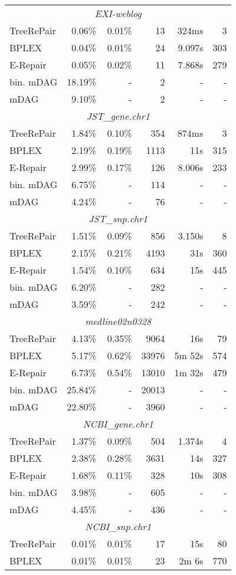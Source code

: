 \documentclass[12pt]{llncs}
\begin{document}
\begin{longtable}{lrrrrr}
			\midrule\multicolumn{6}{c}{\emph{EXI-weblog}}\\*
			TreeRePair&0.06\%&0.01\%&13&324ms&3\\*
			BPLEX&0.04\%&0.01\%&24&9.097s&303\\*
			E-Repair&0.05\%&0.02\%&11&7.868s&279\\*
			bin. mDAG&18.19\%&-&2&-&-\\*
			mDAG&9.10\%&-&2&-&-\\
			\midrule\multicolumn{6}{c}{\emph{JST\_gene.chr1}}\\*
			TreeRePair&1.84\%&0.10\%&354&874ms&3\\*
			BPLEX&2.19\%&0.19\%&1113&11s&315\\*
			E-Repair&2.99\%&0.17\%&126&8.006s&233\\*
			bin. mDAG&6.75\%&-&114&-&-\\*
			mDAG&4.24\%&-&76&-&-\\
			\midrule\multicolumn{6}{c}{\emph{JST\_snp.chr1}}\\*
			TreeRePair&1.51\%&0.09\%&856&3.150s&8\\*
			BPLEX&2.15\%&0.21\%&4193&31s&360\\*
			E-Repair&1.54\%&0.10\%&634&15s&445\\*
			bin. mDAG&6.20\%&-&282&-&-\\*
			mDAG&3.59\%&-&242&-&-\\
			\midrule\multicolumn{6}{c}{\emph{medline02n0328}}\\*
			TreeRePair&4.13\%&0.35\%&9064&16s&79\\*
			BPLEX&5.17\%&0.62\%&33976&5m 52s&574\\*
			E-Repair&6.73\%&0.54\%&13010&1m 32s&479\\*
			bin. mDAG&25.84\%&-&20013&-&-\\*
			mDAG&22.80\%&-&3960&-&-\\
			\midrule\multicolumn{6}{c}{\emph{NCBI\_gene.chr1}}\\*
			TreeRePair&1.37\%&0.09\%&504&1.374s&4\\*
			BPLEX&2.38\%&0.28\%&3631&14s&327\\*
			E-Repair&1.68\%&0.11\%&328&10s&308\\*
			bin. mDAG&3.98\%&-&605&-&-\\*
			mDAG&4.45\%&-&436&-&-\\
			\midrule\multicolumn{6}{c}{\emph{NCBI\_snp.chr1}}\\*
			TreeRePair&\,0.01\%&\,0.01\%&17&15s&80\\*
			BPLEX&\,0.01\%&\,0.01\%&23&2m 6s&770\\*

\end{longtable}
\end{document}
